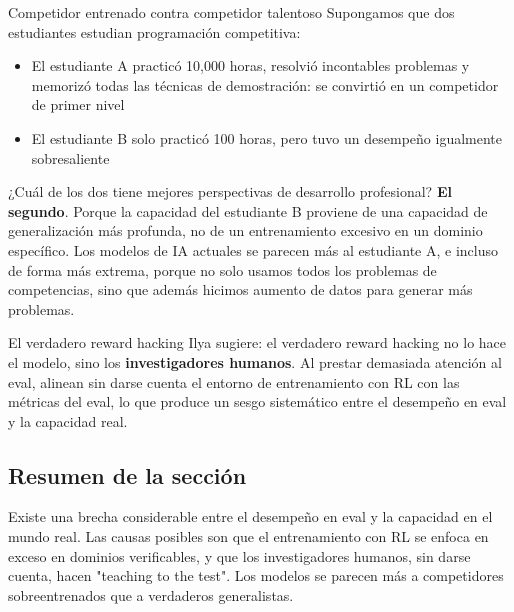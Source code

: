 \begin{importantbox}{Competidor entrenado contra competidor talentoso}
Supongamos que dos estudiantes estudian programación competitiva:
\begin{itemize}
    \item El estudiante A practicó 10,000 horas, resolvió incontables problemas y memorizó todas las técnicas de demostración: se convirtió en un competidor de primer nivel
    \item El estudiante B solo practicó 100 horas, pero tuvo un desempeño igualmente sobresaliente
\end{itemize}
¿Cuál de los dos tiene mejores perspectivas de desarrollo profesional? \textbf{El segundo}. Porque la capacidad del estudiante B proviene de una capacidad de generalización más profunda, no de un entrenamiento excesivo en un dominio específico. Los modelos de IA actuales se parecen más al estudiante A, e incluso de forma más extrema, porque no solo usamos todos los problemas de competencias, sino que además hicimos aumento de datos para generar más problemas.
\end{importantbox}

\begin{warningbox}{El verdadero reward hacking}
Ilya sugiere: el verdadero reward hacking no lo hace el modelo, sino los \textbf{investigadores humanos}. Al prestar demasiada atención al eval, alinean sin darse cuenta el entorno de entrenamiento con RL con las métricas del eval, lo que produce un sesgo sistemático entre el desempeño en eval y la capacidad real.
\end{warningbox}

\subsection{Resumen de la sección}

Existe una brecha considerable entre el desempeño en eval y la capacidad en el mundo real. Las causas posibles son que el entrenamiento con RL se enfoca en exceso en dominios verificables, y que los investigadores humanos, sin darse cuenta, hacen "teaching to the test". Los modelos se parecen más a competidores sobreentrenados que a verdaderos generalistas.
